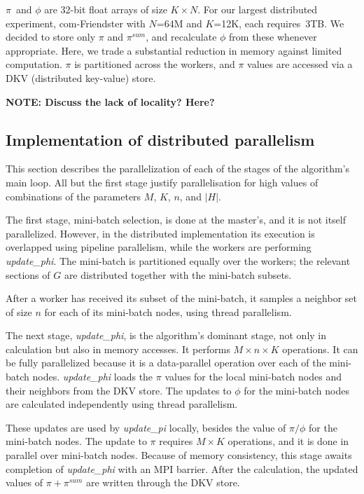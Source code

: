 $\pi$~and $\phi$ are 32-bit float arrays of size $K \times N$. For our
largest distributed experiment, com-Friendster with $N$=64M and $K$=12K, each
requires~3TB. We decided to store only $\pi$ and $\pi^{sum}$, and recalculate
$\phi$ from these whenever appropriate. Here, we trade a substantial reduction
in memory against limited computation. $\pi$ is partitioned across the workers,
and $\pi$ values are accessed via a DKV (distributed key-value) store.


{\Large\bf NOTE: Discuss the lack of locality? Here?}


\subsection{Implementation of distributed parallelism}

This section describes the parallelization of each of the stages of the
algorithm's main loop. All but the first stage justify parallelisation for
high values of combinations of the  parameters $M$, $K$, $n$, and $|H|$.

The first stage, mini-batch selection, is done at the master's, and it is
not itself parallelized. However, in the distributed implementation its
execution is overlapped using pipeline parallelism, while the workers are
performing \textit{update\_phi}. The mini-batch is partitioned equally over
the workers; the relevant sections of $G$ are distributed together with the
mini-batch subsets.

After a worker has received its subset of the mini-batch, it samples a neighbor
set of size $n$ for each of its mini-batch nodes, using thread parallelism.

The next stage, \textit{update\_phi}, is the algorithm's dominant stage, not
only in calculation but also in memory accesses. It performs $M\times n\times
K$ operations. It can be fully parallelized because it is a data-parallel
operation over each of the mini-batch nodes. \textit{update\_phi} loads the
$\pi$ values for the local mini-batch nodes and their neighbors from the
DKV store. The updates to $\phi$ for the mini-batch nodes are calculated
independently using thread parallelism.

These updates are used by \textit{update\_pi} locally, besides the value of
$\pi/\phi$ for the mini-batch nodes. The update to $\pi$ requires $M\times
K$ operations, and it is done in parallel over mini-batch nodes. Because of
memory consistency, this stage awaits completion of \textit{update\_phi} with
an MPI barrier. After the calculation, the updated values of $\pi+\pi^{sum}$
are written through the DKV store.

